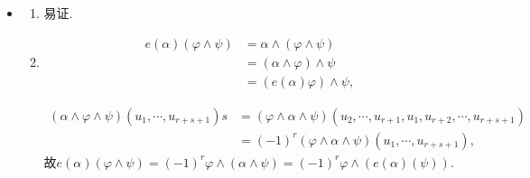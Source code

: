 \begin{itemize}
\begin{enumerate}
	\item[(2)]
		\begin{align*}
			i(u_1)(\varphi\wedge\psi)&(u_2,\cdots,u_{r+s})
			=\sum_{\substack{i_1<\cdots<i_r\\ i_{r+1}<\cdots<i_{r+s}}}\delta_{1,\cdots,r+s}^{i_1,\cdots,i_{r+s}} 				\varphi(u_{i_1},\cdots,u_{i_r})\psi(u_{i_{r+1}},\cdots,u_{i_{r+s}})\\
			&=\sum_{\substack{i_1<\cdots<i_r\\ i_{r+1}<\cdots<i_{r+s}}} \Big[\sum\limits_{1\in \{i_1,\cdots,i_r\}}					\delta_{1,2,\cdots,r+s}^{1,i_2,\cdots,i_{r+s}}\varphi(u_1,u_{i_2},\cdots,u_{i_r})\psi(u_{i_{r+1}},\cdots,u_{i_{r+s}})\\
			&\ \ \ \ +\sum\limits_{1\notin \{i_1,\cdots,i_r\}} \delta_{1,\cdots,r,r+1,r+2,\cdots,r+s}^{i_1,\cdots,i_r,1,i_{r+2},\cdots,i_{r+s}}\varphi(u_{i_1},\cdots,u_{i_r})\psi(u_1,u_{i_{r+2}},\cdots,u_{i_{r+s}})\Big]\\
			&=\sum_{\substack{i_2<\cdots<i_r\\ i_{r+1}<\cdots<i_{r+s}}} \delta_{2,\cdots,r+s}^{i_2,\cdots,i_{r+s}}(i(u_1)\varphi)(u_{i_2},\cdots,u_{i_r})\psi(u_{i_{r+1}},\cdots,u_{i_{r+s}})\\
			&\ \ \ \ +(-1)^r\sum_{\substack{i_1<\cdots<i_r\\ i_{r+2}<\cdots<i_{r+s}}} \delta_{2,\cdots,r+1,r+2,\cdots,r+s}^{i_1,\cdots,i_r,i_{r+2},\cdots,i_{r+s}}\varphi(u_{i_1},\cdots,u_{i_r})(i(u_1)\psi)(u_{i_{r+2}},\cdots,u_{i_{r+s}})\\
			&=((i(u_1)\varphi)\wedge \psi+(-1)^r\varphi \wedge (i(u_1)\psi))(u_2,\cdots,u_{r+s}).
		\end{align*}
	
	\end{enumerate}
	
	
	\item[45.]
	\begin{enumerate}
	\item[(1)]
		易证.
		
	\item[(2)]
		\begin{align*}
			e(\alpha)(\varphi\wedge \psi)&=\alpha\wedge(\varphi\wedge \psi)\\
			&=(\alpha\wedge\varphi)\wedge\psi\\
			&=(e(\alpha)\varphi)\wedge\psi,
		\end{align*}

        \begin{align*}
            (\alpha\wedge\varphi\wedge\psi)(u_1,\cdots,u_{r+s+1})s
								&=(\varphi\wedge\alpha\wedge\psi)(u_2,\cdots,u_{r+1},u_1,u_{r+2},\cdots,u_{r+s+1})\\
								&=(-1)^r(\varphi\wedge\alpha\wedge\psi)(u_1,\cdots,u_{r+s+1}),
		\end{align*}
	故$e(\alpha)(\varphi\wedge\psi)=(-1)^r\varphi\wedge(\alpha\wedge\psi)=(-1)^r\varphi\wedge (e(\alpha)(\psi)).$
	

\end{enumerate}
\end{itemize}
